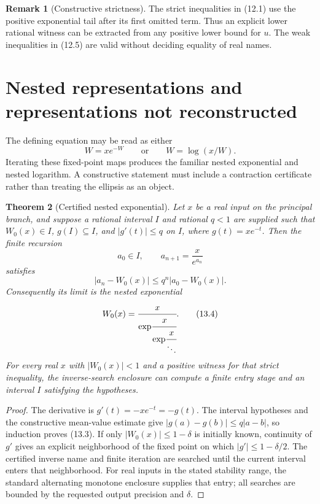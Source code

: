 \documentclass[11pt]{article}
\newtheorem{theorem}{Theorem}[section]
\theoremstyle{definition}
\newtheorem{remark}[theorem]{Remark}
\newcommand{\abs}[1]{\left|#1\right|}
\begin{document}
\begin{remark}[Constructive strictness]
The strict inequalities in (12.1) use the positive exponential tail after its
first omitted term.  Thus an explicit lower rational witness can be extracted
from any positive lower bound for \(u\).  The weak inequalities in (12.5) are
valid without deciding equality of real names.
\end{remark}

\section{Nested representations and representations not reconstructed}\label{sec:representations}

The defining equation may be read as either
\[
 W=x e^{-W}
 \qquad\text{or}\qquad
 W=\log(x/W).
 \tag{13.1}
\]
Iterating these fixed-point maps produces the familiar nested exponential and
nested logarithm.  A constructive statement must include a contraction
certificate rather than treating the ellipsis as an object.

\begin{theorem}[Certified nested exponential]\label{thm:nested-exp}
Let \(x\) be a real input on the principal branch, and suppose a rational
interval \(I\) and rational \(q<1\) are supplied such that
\(W_0(x)\in I\), \(g(I)\subseteq I\), and
\(\abs{g'(t)}\le q\) on \(I\), where \(g(t)=xe^{-t}\).  Then the finite
recursion
\[
 a_0\in I,\qquad a_{n+1}=\frac{x}{e^{a_n}}
 \tag{13.2}
\]
satisfies
\[
 \abs{a_n-W_0(x)}\le q^n\abs{a_0-W_0(x)}.
 \tag{13.3}
\]
Consequently its limit is the nested exponential
\[
 W_0(x)=\cfrac{x}{\exp\!\cfrac{x}{\exp\!\cfrac{x}{\ddots}}}.
 \tag{13.4}
\]
For every real \(x\) with \(\abs{W_0(x)}<1\) and a positive witness for that
strict inequality, the inverse-search enclosure can compute a finite entry
stage and an interval \(I\) satisfying the hypotheses.
\end{theorem}

\begin{proof}
The derivative is \(g'(t)=-xe^{-t}=-g(t)\).  The interval hypotheses and the
constructive mean-value estimate give
\(\abs{g(a)-g(b)}\le q\abs{a-b}\), so induction proves (13.3).  If only
\(\abs{W_0(x)}\le1-\delta\) is initially known, continuity of \(g'\) gives an
explicit neighborhood of the fixed point on which \(\abs{g'}\le1-\delta/2\).
The certified inverse name and finite iteration are searched until the current
interval enters that neighborhood.  For real inputs in the stated stability
range, the standard alternating monotone enclosure supplies that entry; all
searches are bounded by the requested output precision and \(\delta\).
\end{proof}
\end{document}
